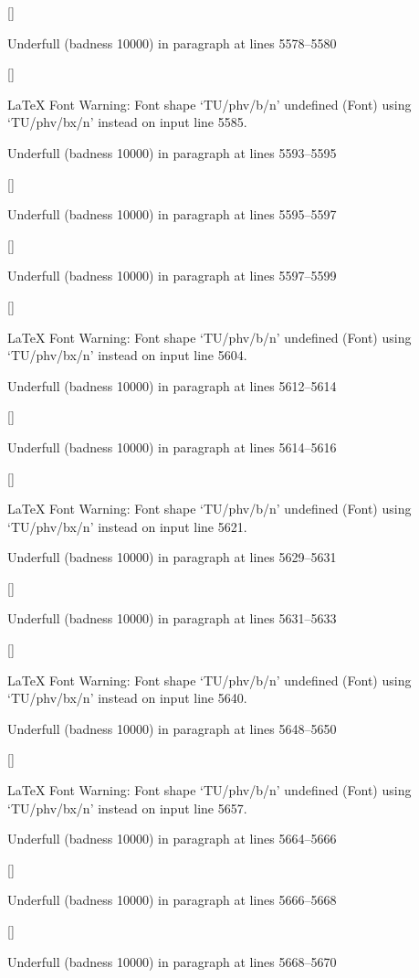  []


Underfull \hbox (badness 10000) in paragraph at lines 5578--5580

 []


LaTeX Font Warning: Font shape `TU/phv/b/n' undefined
(Font)              using `TU/phv/bx/n' instead on input line 5585.


Underfull \hbox (badness 10000) in paragraph at lines 5593--5595

 []


Underfull \hbox (badness 10000) in paragraph at lines 5595--5597

 []


Underfull \hbox (badness 10000) in paragraph at lines 5597--5599

 []


LaTeX Font Warning: Font shape `TU/phv/b/n' undefined
(Font)              using `TU/phv/bx/n' instead on input line 5604.


Underfull \hbox (badness 10000) in paragraph at lines 5612--5614

 []


Underfull \hbox (badness 10000) in paragraph at lines 5614--5616

 []


LaTeX Font Warning: Font shape `TU/phv/b/n' undefined
(Font)              using `TU/phv/bx/n' instead on input line 5621.


Underfull \hbox (badness 10000) in paragraph at lines 5629--5631

 []


Underfull \hbox (badness 10000) in paragraph at lines 5631--5633

 []


LaTeX Font Warning: Font shape `TU/phv/b/n' undefined
(Font)              using `TU/phv/bx/n' instead on input line 5640.


Underfull \hbox (badness 10000) in paragraph at lines 5648--5650

 []


LaTeX Font Warning: Font shape `TU/phv/b/n' undefined
(Font)              using `TU/phv/bx/n' instead on input line 5657.


Underfull \hbox (badness 10000) in paragraph at lines 5664--5666

 []


Underfull \hbox (badness 10000) in paragraph at lines 5666--5668

 []


Underfull \hbox (badness 10000) in paragraph at lines 5668--5670

